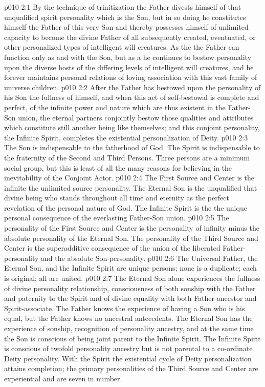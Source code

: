 \vs p010 2:1 By the technique of trinitization the Father divests himself of that unqualified spirit personality which is the Son, but in so doing he constitutes himself the Father of this very Son and thereby possesses himself of unlimited capacity to become the divine Father of all subsequently created, eventuated, or other personalized types of intelligent will creatures. As the  the Father can function only as and with the Son, but as a  he continues to bestow personality upon the diverse hosts of the differing levels of intelligent will creatures, and he forever maintains personal relations of loving association with this vast family of universe children.
\vs p010 2:2 After the Father has bestowed upon the personality of his Son the fullness of himself, and when this act of self\hyp{}bestowal is complete and perfect, of the infinite power and nature which are thus existent in the Father\hyp{}Son union, the eternal partners conjointly bestow those qualities and attributes which constitute still another being like themselves; and this conjoint personality, the Infinite Spirit, completes the existential personalization of Deity.
\vs p010 2:3 The Son is indispensable to the fatherhood of God. The Spirit is indispensable to the fraternity of the Second and Third Persons. Three persons are a minimum social group, but this is least of all the many reasons for believing in the inevitability of the Conjoint Actor.
\vs p010 2:4 \pc The First Source and Center is the infinite  the unlimited source personality. The Eternal Son is the unqualified  that divine being who stands throughout all time and eternity as the perfect revelation of the personal nature of God. The Infinite Spirit is the  the unique personal consequence of the everlasting Father\hyp{}Son union.
\vs p010 2:5 \pc The personality of the First Source and Center is the personality of infinity minus the absolute personality of the Eternal Son. The personality of the Third Source and Center is the superadditive consequence of the union of the liberated Father\hyp{}personality and the absolute Son\hyp{}personality.
\vs p010 2:6 \pc The Universal Father, the Eternal Son, and the Infinite Spirit are unique persons; none is a duplicate; each is original; all are united.
\vs p010 2:7 \pc The Eternal Son alone experiences the fullness of divine personality relationship, consciousness of both sonship with the Father and paternity to the Spirit and of divine equality with both Father\hyp{}ancestor and Spirit\hyp{}associate. The Father knows the experience of having a Son who is his equal, but the Father knows no ancestral antecedents. The Eternal Son has the experience of sonship, recognition of personality ancestry, and at the same time the Son is conscious of being joint parent to the Infinite Spirit. The Infinite Spirit is conscious of twofold personality ancestry but is not parental to a co\hyp{}ordinate Deity personality. With the Spirit the existential cycle of Deity personalization attains completion; the primary personalities of the Third Source and Center are experiential and are seven in number.
